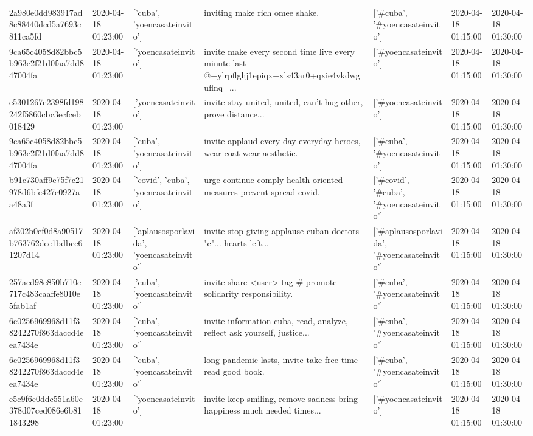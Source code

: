 \begin{tabular}{lllllll}
2a980e0dd983917ad8c88440dcd5a7693c811ca5fd & 2020-04-18 01:23:00 & ['cuba', 'yoencasateinvito'] & inviting make rich omee shake. & ['#cuba', '#yoencasateinvito'] & 2020-04-18 01:15:00 & 2020-04-18 01:30:00 \\
9ca65c4058d82bbc5b963e2f21d0faa7dd847004fa & 2020-04-18 01:23:00 & ['yoencasateinvito'] & invite make every second time live every minute last @+ylrpflghj1epiqx+xls43ar0+qxie4vkdwguflnq=... & ['#yoencasateinvito'] & 2020-04-18 01:15:00 & 2020-04-18 01:30:00 \\
e5301267e2398fd198242f5860cbc3ecfceb018429 & 2020-04-18 01:23:00 & ['yoencasateinvito'] & invite stay united, united, can't hug other, prove distance... & ['#yoencasateinvito'] & 2020-04-18 01:15:00 & 2020-04-18 01:30:00 \\
9ca65c4058d82bbc5b963e2f21d0faa7dd847004fa & 2020-04-18 01:23:00 & ['cuba', 'yoencasateinvito'] & invite applaud every day everyday heroes, wear coat wear aesthetic. & ['#cuba', '#yoencasateinvito'] & 2020-04-18 01:15:00 & 2020-04-18 01:30:00 \\
b91c730aff9e75f7c21978d6bfe427e0927aa48a3f & 2020-04-18 01:23:00 & ['covid', 'cuba', 'yoencasateinvito'] & urge continue comply health-oriented measures prevent spread covid. & ['#covid', '#cuba', '#yoencasateinvito'] & 2020-04-18 01:15:00 & 2020-04-18 01:30:00 \\
af302b0ef0d8a90517b763762dec1bdbcc61207d14 & 2020-04-18 01:23:00 & ['aplausosporlavida', 'yoencasateinvito'] & invite stop giving applause cuban doctors "c"... hearts left... & ['#aplausosporlavida', '#yoencasateinvito'] & 2020-04-18 01:15:00 & 2020-04-18 01:30:00 \\
257acd98e850b710c717c483caaffe8010e5fab1af & 2020-04-18 01:23:00 & ['cuba', 'yoencasateinvito'] & invite share <user> tag \# promote solidarity responsibility. & ['#cuba', '#yoencasateinvito'] & 2020-04-18 01:15:00 & 2020-04-18 01:30:00 \\
6e0256969968d11f38242270f863daccd4eea7434e & 2020-04-18 01:23:00 & ['cuba', 'yoencasateinvito'] & invite information cuba, read, analyze, reflect ask yourself, justice... & ['#cuba', '#yoencasateinvito'] & 2020-04-18 01:15:00 & 2020-04-18 01:30:00 \\
6e0256969968d11f38242270f863daccd4eea7434e & 2020-04-18 01:23:00 & ['cuba', 'yoencasateinvito'] & long pandemic lasts, invite take free time read good book. & ['#cuba', '#yoencasateinvito'] & 2020-04-18 01:15:00 & 2020-04-18 01:30:00 \\
e5c9f6e0ddc551a60e378d07ced086e6b811843298 & 2020-04-18 01:23:00 & ['yoencasateinvito'] & invite keep smiling, remove sadness bring happiness much needed times... & ['#yoencasateinvito'] & 2020-04-18 01:15:00 & 2020-04-18 01:30:00 \\

\end{tabular}
